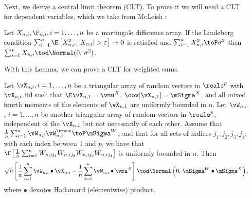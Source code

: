 Next, we derive a central limit theorem (CLT).  To prove it we will need a
CLT for dependent variables, which we take from McLeish \cite{mcleish1974dcl}:

\begin{lemma}\label{L:mcleigh}
    Let $X_{n,i}, \F_{n,i}, i = 1, \ldots, n$ be a martingale difference 
    array.  If the Lindeberg condition 
    $\sum_{i=1}^n \E \left[ X_{n,i}^2 ; | X_{n,i} | > \varepsilon \right] \to 0$
    is satisfied and $\sum_{i=1}^n X_{n,i}^2 \toP \sigma^2$ then
    $\sum_{i=1}^n X_{n,i} \tod \Normal (0, \, \sigma^2)$.
\end{lemma}

\noindent
With this Lemma, we can prove a CLT for weighted sums.

\begin{proposition}\label{P:weighted-clt}
    Let $\vX_{n,i}, i = 1, \ldots, n$ be a triangular array of random vectors
    in $\reals^p$ with $\vX_{n,i}$ iid
    such that $\E \vX_{n,1} = \vmu^X$, $\cov[ \vX_{n,1}] = \mSigma^X$, and all 
    mixed fourth moments of the elements of $\vX_{n,1}$ are uniformly bounded in 
    $n$.  Let  $\vW_{n,i}$, $i = 1, \ldots, n$ be another triangular array 
    of random 
    vectors in $\reals^p$, independent of the $\vX_{n,i}$ but not necessarily 
    of each other.  Assume that 
    $\frac{1}{n} \sum_{i=1}^n \vW_{n,i} \vW_{n,i}^\trans \toP \mSigma^W$, and 
    that for
    all sets of indices $j_1, j_2, j_3, j_4$, with each index between $1$ and
    $p$, we have that
    \(
        \E \left[ 
            \frac{1}{n}
            \sum_{i=1}^n
                W_{n,ij_1} 
                W_{n,ij_2} 
                W_{n,ij_3} 
                W_{n,ij_4} 
        \right]
    \) is uniformly bounded in $n$.  Then
    \begin{equation}
        \sqrt{n}
        \left[
            \frac{1}{n}
            \sum_{i=1}^n
                \vW_{n,i} \bullet \vX_{n,i}
            -
            \frac{1}{n} 
            \sum_{i=1}^n 
                \vW_{n,i} \bullet \vmu^X
        \right]
        \tod
        \Normal\left( 0, \, \mSigma^W \bullet \mSigma^X \right),
    \end{equation}
    where $\bullet$ denotes Hadamard (elementwise) product.
\end{proposition}
